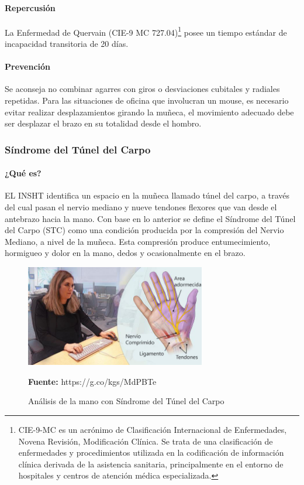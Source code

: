 \paragraph{Repercusión}
La Enfermedad de Quervain (CIE-9 MC 727.04)\footnote{CIE-9-MC es un acrónimo de Clasificación Internacional de Enfermedades, Novena Revisión, Modificación Clínica. Se trata de una clasificación de enfermedades y procedimientos utilizada en la codificación de información clínica derivada de la asistencia sanitaria, principalmente en el entorno de hospitales y centros de atención médica especializada.} posee un tiempo estándar de incapacidad transitoria de 20 días. \parencite[6]{INSHT2017TendinitisPulgar}
\paragraph{Prevención}
Se aconseja no combinar agarres con giros o desviaciones cubitales y radiales repetidas. Para las situaciones de oficina que involucran un mouse, es necesario evitar realizar desplazamientos girando la muñeca, el movimiento adecuado debe ser desplazar el brazo en su totalidad desde el hombro.  \parencite[5]{INSHT2017TendinitisPulgar}
\subsubsection{Síndrome del Túnel del Carpo}
\paragraph{¿Qué es?}
EL INSHT identifica un espacio en la muñeca llamado túnel del carpo, a través del cual pasan el nervio mediano y nueve tendones flexores que van desde el antebrazo hacia la mano. \parencite[1]{INSHT2017SindromeCarpiano} Con base en lo anterior se define el Síndrome del Túnel del Carpo (STC) como una condición producida por la compresión del Nervio Mediano, a nivel de la muñeca. Esta compresión produce entumecimiento, hormigueo y dolor en la mano, dedos y ocasionalmente en el brazo. \parencite[1]{INSHT2017SindromeCarpiano}

\begin{figure}[H]
    \centering
    \includegraphics[width=0.7\textwidth]{Anexos/LATEX/chapters/images/STC.jpg}
    \caption{Análisis de la mano con Síndrome del Túnel del Carpo}
    \small{\textbf{Fuente:} https://g.co/kgs/MdPBTe}
    \label{STC}
\end{figure}

